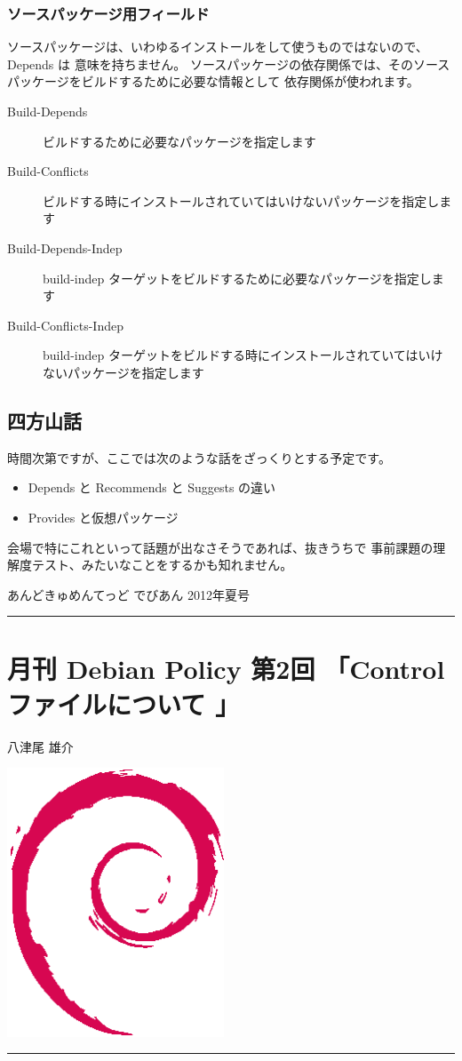 \documentclass[mingoth,a4paper]{jsarticle}
\renewcommand{\dancersection}[2]{%
\newpage
あんどきゅめんてっど でびあん 2012年夏号
%
\vspace{0.1mm}\\
{\color{dancerdarkblue}\rule{\hsize}{2mm}}

%
%
\begin{minipage}[t]{0.6\hsize}
\color{dancerdarkblue}
\vspace{1cm}
\section{#1}
\hfill{}#2\\
\end{minipage}
\begin{minipage}[t]{0.4\hsize}
\vspace{-2cm}
\hfill{}\includegraphics[height=8cm]{image200502/openlogo-nd.eps}\\
\vspace{-5cm}
\end{minipage}
%
{\color{dancerlightblue}\rule{0.66\hsize}{2mm}}
%
\vspace{2cm}
}
\begin{document}
\subsubsection{ソースパッケージ用フィールド}

ソースパッケージは、いわゆるインストールをして使うものではないので、Depends は
意味を持ちません。
ソースパッケージの依存関係では、そのソースパッケージをビルドするために必要な情報として
依存関係が使われます。

\begin{description}
\item[Build-Depends] ビルドするために必要なパッケージを指定します
\item[Build-Conflicts] ビルドする時にインストールされていてはいけないパッケージを指定します
\item[Build-Depends-Indep] build-indep ターゲットをビルドするために必要なパッケージを指定します
\item[Build-Conflicts-Indep] build-indep ターゲットをビルドする時にインストールされていてはいけないパッケージを指定します
\end{description}


\subsection{四方山話}

時間次第ですが、ここでは次のような話をざっくりとする予定です。

\begin{itemize}
\item Depends と Recommends と Suggests の違い
\item Provides と仮想パッケージ
\end{itemize}

会場で特にこれといって話題が出なさそうであれば、抜きうちで
事前課題の理解度テスト、みたいなことをするかも知れません。



\dancersection{月刊 Debian Policy 第2回 「Controlファイルについて 」}{八津尾 雄介}
\end{document}
